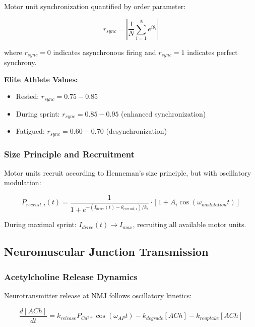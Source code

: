 Motor unit synchronization quantified by order parameter:

\begin{equation}
r_{sync} = \left|\frac{1}{N}\sum_{i=1}^{N} e^{i\theta_i}\right|
\label{eq:synchronization_index}
\end{equation}

where $r_{sync} = 0$ indicates asynchronous firing and $r_{sync} = 1$ indicates perfect synchrony.

\textbf{Elite Athlete Values:}
\begin{itemize}
\item Rested: $r_{sync} = 0.75-0.85$
\item During sprint: $r_{sync} = 0.85-0.95$ (enhanced synchronization)
\item Fatigued: $r_{sync} = 0.60-0.70$ (desynchronization)
\end{itemize}

\subsubsection{Size Principle and Recruitment}

Motor units recruit according to Henneman's size principle, but with oscillatory modulation:

\begin{equation}
P_{recruit,i}(t) = \frac{1}{1 + e^{-(I_{drive}(t) - \theta_{recruit,i})/k_i}} \cdot [1 + A_i \cos(\omega_{modulation} t)]
\label{eq:recruitment_probability}
\end{equation}

During maximal sprint: $I_{drive}(t) \to I_{max}$, recruiting all available motor units.

\subsection{Neuromuscular Junction Transmission}

\subsubsection{Acetylcholine Release Dynamics}

Neurotransmitter release at NMJ follows oscillatory kinetics:

\begin{equation}
\frac{d[ACh]}{dt} = k_{release} P_{Ca^{2+}} \cos(\omega_{AP} t) - k_{degrade}[ACh] - k_{reuptake}[ACh]
\label{eq:ach_dynamics}
\end{equation}

